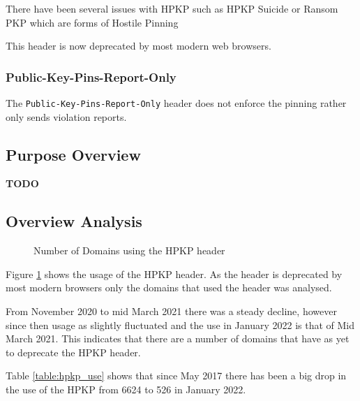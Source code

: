 \documentclass{mscreport}
\begin{document}
\vspace{0.3cm} \noindent
There have been several issues with HPKP such as HPKP Suicide \cite{Chen2018-ft,Chuat2021-nf} or Ransom PKP \cite{Chuat2021-nf} which are forms of Hostile Pinning \cite{Evans2018-mi}

\vspace{0.3cm} \noindent
This header is now deprecated by most modern web browsers.

\subsubsection{Public-Key-Pins-Report-Only}
The \texttt{Public-Key-Pins-Report-Only} header does not enforce the pinning rather only sends violation reports.

\subsection{Purpose Overview}

\textbf{TODO}

\newpage

\subsection{Overview Analysis}

\begin{figure}[t]
	\begin{center}
		\caption{Number of Domains using the HPKP header}
		\label{fig:pkp_overview}
	\end{center}
\end{figure}

\noindent
Figure \ref{fig:pkp_overview} shows the usage of the HPKP header. As the header is deprecated by most modern browsers only the domains that used the header was analysed.

\vspace{0.3cm} \noindent
From November 2020 to mid March 2021 there was a steady decline, however since then usage as slightly fluctuated and the use in January 2022 is that of Mid March 2021. This indicates that there are a number of domains that have as yet to deprecate the HPKP header.

\vspace{0.3cm} \noindent
Table \ref{table:hpkp_use} shows that since May 2017 there has been a big drop in the use of the HPKP from 6624 to 526 in January 2022.
\end{document}
